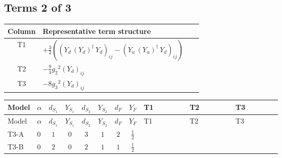 \documentclass[8pt]{article}
\begin{document}
\begin{landscape}
\subsection*{Terms 2 of 3}
\begin{center}
\begin{tabular}{@{}c >{\raggedright\arraybackslash}p{0.82\linewidth}@{}}
\toprule
Column & Representative term structure \\
\midrule
T1 & \(\displaystyle +\frac{3}{2} (\left({Y_d}\,\left({Y_d}\right)^{\dagger}\,{Y_d}\right)_{ij}-\left({Y_u}\,\left({Y_u}\right)^{\dagger}\,{Y_d}\right)_{ij})\) \\
\midrule
T2 & \(\displaystyle -\frac{9}{4} {g_2}^2 \left({Y_d}\right)_{ij}\) \\
\midrule
T3 & \(\displaystyle -8 {g_3}^2 \left({Y_d}\right)_{ij}\) \\
\midrule
\bottomrule
\end{tabular}
\end{center}
\smallskip
\tiny
\begin{longtable}{@{}llcccccc >{\raggedright\arraybackslash}p{0.21\linewidth} >{\raggedright\arraybackslash}p{0.21\linewidth} >{\raggedright\arraybackslash}p{0.21\linewidth}@{}}
\toprule
Model & $\alpha$ & $d_{S_1}$ & $Y_{S_1}$ & $d_{S_2}$ & $Y_{S_2}$ & $d_F$ & $Y_F$ & T1 & T2 & T3 \\
\midrule
\endfirsthead
\toprule
Model & $\alpha$ & $d_{S_1}$ & $Y_{S_1}$ & $d_{S_2}$ & $Y_{S_2}$ & $d_F$ & $Y_F$ & T1 & T2 & T3 \\
\midrule
\endhead
T3-A & $0$ & $1$ & $0$ & $3$ & $1$ & $2$ & $\frac{1}{2}$ & \scriptsize\adjustbox{max width=\linewidth}{$\begin{gathered} +\frac{3}{2} (\left({Y_d}\,\left({Y_d}\right)^{\dagger}\,{Y_d}\right)_{ij}-\left({Y_u}\,\left({Y_u}\right)^{\dagger}\,{Y_d}\right)_{ij})\end{gathered}$} & \scriptsize\adjustbox{max width=\linewidth}{$\begin{gathered} -\frac{9}{4} {g_2}^2 \left({Y_d}\right)_{ij}\end{gathered}$} & \scriptsize\adjustbox{max width=\linewidth}{$\begin{gathered} -8 {g_3}^2 \left({Y_d}\right)_{ij}\end{gathered}$} \\
\midrule
T3-B & $0$ & $2$ & $0$ & $2$ & $1$ & $1$ & $\frac{1}{2}$ & \scriptsize\adjustbox{max width=\linewidth}{$\begin{gathered} +\frac{3}{2} (\left({Y_d}\,\left({Y_d}\right)^{\dagger}\,{Y_d}\right)_{ij}-\left({Y_u}\,\left({Y_u}\right)^{\dagger}\,{Y_d}\right)_{ij})\end{gathered}$} & \scriptsize\adjustbox{max width=\linewidth}{$\begin{gathered} -\frac{9}{4} {g_2}^2 \left({Y_d}\right)_{ij}\end{gathered}$} & \scriptsize\adjustbox{max width=\linewidth}{$\begin{gathered} -8 {g_3}^2 \left({Y_d}\right)_{ij}\end{gathered}$} \\

\end{longtable}
\end{landscape}
\end{document}
